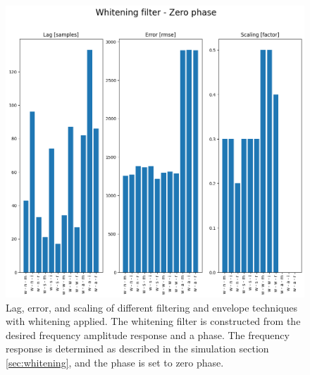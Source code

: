 \begin{figure}[h!t]
	\begin{center}
		\includegraphics[width=1.0\columnwidth]{images/result_whitening_zerophase.png}
	\end{center}
	\caption{Lag, error, and scaling of different filtering and envelope techniques with whitening applied. The whitening filter is constructed from the desired frequency amplitude response and a phase. The frequency response is determined as described in the simulation section \ref{sec:whitening}, and the phase is set to zero phase.}
	\label{fig:result_whitening_sourcephase}
\end{figure}